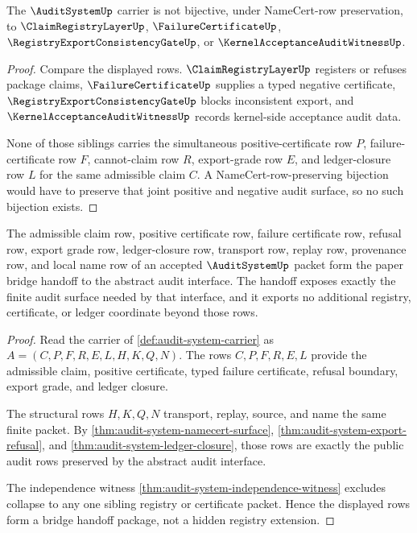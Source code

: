 \begin{theorem}
\label{thm:audit-system-independence-witness}
The $\AuditSystemUp$ carrier is not bijective, under NameCert-row preservation, to $\ClaimRegistryLayerUp$, $\FailureCertificateUp$, $\RegistryExportConsistencyGateUp$, or $\KernelAcceptanceAuditWitnessUp$.
\end{theorem}
\begin{proof}
Compare the displayed rows. $\ClaimRegistryLayerUp$ registers or refuses package claims, $\FailureCertificateUp$ supplies a typed negative certificate, $\RegistryExportConsistencyGateUp$ blocks inconsistent export, and $\KernelAcceptanceAuditWitnessUp$ records kernel-side acceptance audit data.

None of those siblings carries the simultaneous positive-certificate row $P$, failure-certificate row $F$, cannot-claim row $R$, export-grade row $E$, and ledger-closure row $L$ for the same admissible claim $C$. A NameCert-row-preserving bijection would have to preserve that joint positive and negative audit surface, so no such bijection exists.
\end{proof}

\begin{theorem}
\label{thm:auditsystem-bridged-handoff-package}
The admissible claim row, positive certificate row, failure certificate row, refusal row, export grade row, ledger-closure row, transport row, replay row, provenance row, and local name row of an accepted $\AuditSystemUp$ packet form the paper bridge handoff to the abstract audit interface. The handoff exposes exactly the finite audit surface needed by that interface, and it exports no additional registry, certificate, or ledger coordinate beyond those rows.
\end{theorem}
\begin{proof}
Read the carrier of \autoref{def:audit-system-carrier} as $A=(C,P,F,R,E,L,H,K,Q,N)$. The rows $C,P,F,R,E,L$ provide the admissible claim, positive certificate, typed failure certificate, refusal boundary, export grade, and ledger closure.

The structural rows $H,K,Q,N$ transport, replay, source, and name the same finite packet. By \autoref{thm:audit-system-namecert-surface}, \autoref{thm:audit-system-export-refusal}, and \autoref{thm:audit-system-ledger-closure}, those rows are exactly the public audit rows preserved by the abstract audit interface.

The independence witness \autoref{thm:audit-system-independence-witness} excludes collapse to any one sibling registry or certificate packet. Hence the displayed rows form a bridge handoff package, not a hidden registry extension.
\end{proof}

